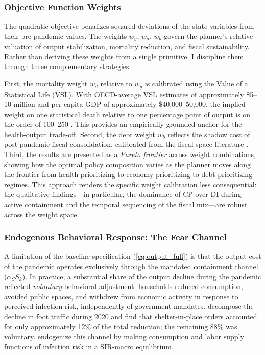 \documentclass[12pt, a4paper]{article}
\begin{document}
\subsubsection*{Objective Function Weights}

The quadratic objective penalizes squared deviations of the state variables from their pre-pandemic values. The weights $w_y$, $w_d$, $w_b$ govern the planner's relative valuation of output stabilization, mortality reduction, and fiscal sustainability. Rather than deriving these weights from a single primitive, I discipline them through three complementary strategies.

First, the mortality weight $w_d$ relative to $w_y$ is calibrated using the Value of a Statistical Life (VSL). With OECD-average VSL estimates of approximately \$5--10 million and per-capita GDP of approximately \$40,000--50,000, the implied weight on one statistical death relative to one percentage point of output is on the order of $100$--$250$ \citep{viscusi2003}. This provides an empirically grounded anchor for the health-output trade-off. Second, the debt weight $w_b$ reflects the shadow cost of post-pandemic fiscal consolidation, calibrated from the fiscal space literature \citep{blanchard2019, mauro2015}. Third, the results are presented as a \textit{Pareto frontier} across weight combinations, showing how the optimal policy composition varies as the planner moves along the frontier from health-prioritizing to economy-prioritizing to debt-prioritizing regimes. This approach renders the specific weight calibration less consequential: the qualitative findings---in particular, the dominance of CP over DI during active containment and the temporal sequencing of the fiscal mix---are robust across the weight space.

\subsubsection*{Endogenous Behavioral Response: The Fear Channel}

A limitation of the baseline specification (\ref{eq:output_full}) is that the output cost of the pandemic operates exclusively through the mandated containment channel ($\alpha_S S_k$). In practice, a substantial share of the output decline during the pandemic reflected \textit{voluntary} behavioral adjustment: households reduced consumption, avoided public spaces, and withdrew from economic activity in response to perceived infection risk, independently of government mandates. \citet{goolsbee2021} decompose the decline in foot traffic during 2020 and find that shelter-in-place orders accounted for only approximately 12\% of the total reduction; the remaining 88\% was voluntary. \citet{eichenbaum2021} endogenize this channel by making consumption and labor supply functions of infection risk in a SIR-macro equilibrium.
\end{document}
